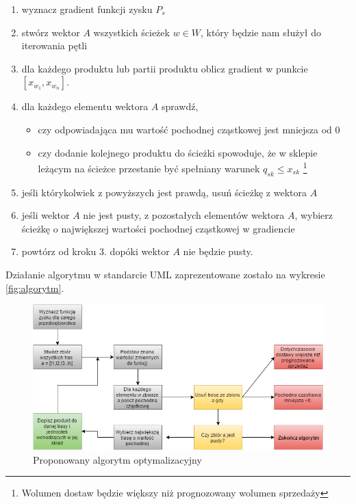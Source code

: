 \documentclass[polish, twoside, 12pt, a4paper]{article}
\theoremstyle{definition}
\theoremstyle{plain}
\theoremstyle{remark}
\begin{document}
\begin{enumerate} 
	\item wyznacz gradient funkcji zysku $P_s$
	\item stwórz wektor $A$ wszystkich ścieżek $w \in W$, który będzie nam służył do iterowania pętli 
	\item dla każdego produktu lub partii produktu oblicz gradient w punkcie $[x_{w_1}, x_{w_n}]$. 
	\item dla każdego elementu wektora $A$ sprawdź, 
		\begin{itemize}
			\item czy odpowiadająca mu wartość pochodnej cząstkowej jest mniejsza od 0
			\item czy dodanie kolejnego produktu do ścieżki spowoduje, że w sklepie leżącym na ścieżce przestanie być spełniany warunek $q_{sk} \le x_{sk}$ \footnote{Wolumen dostaw będzie większy niż prognozowany wolumen sprzedaży} 
		\end{itemize}
	\item jeśli którykolwiek z powyższych jest prawdą, usuń ścieżkę z wektora $A$
	\item jeśli wektor $A$ nie jest pusty, z pozostałych elementów wektora $A$, wybierz ścieżkę o największej wartości pochodnej cząstkowej w gradiencie
	\item powtórz od kroku 3. dopóki wektor $A$ nie będzie pusty.
\end{enumerate}

Działanie algorytmu w standarcie UML zaprezentowane zostało na wykresie \ref{fig:algorytm}.

\begin{figure}
  \centering
\includegraphics[width=\linewidth]{pictures/diagramoptymalizacyny.png}
  \caption{Proponowany algorytm optymalizacyjny}
  \label{fig:diagramoptymalizacyny}

\end{figure}
\end{document}
